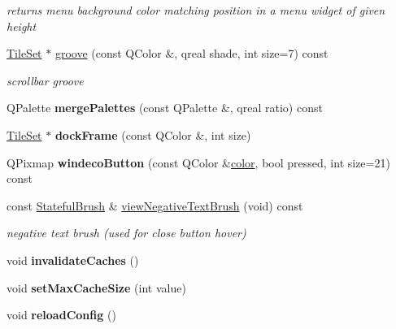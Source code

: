 \begin{Indent}
\begin{DoxyCompactItemize}
\begin{DoxyCompactList}\small\item\em returns menu background color matching position in a menu widget of given height \end{DoxyCompactList}\item 
\mbox{\label{class_style_helper_abae68f2b0645ca73c9b30c8802ee2bd1}} 
\hyperlink{class_tile_set}{Tile\+Set} $\ast$ \hyperlink{class_style_helper_abae68f2b0645ca73c9b30c8802ee2bd1}{groove} (const Q\+Color \&, qreal shade, int size=7) const
\begin{DoxyCompactList}\small\item\em scrollbar groove \end{DoxyCompactList}\item 
\mbox{\label{class_style_helper_ad587578c8c7cf17ac6265a77b0c61fff}} 
Q\+Palette {\bfseries merge\+Palettes} (const Q\+Palette \&, qreal ratio) const
\item 
\mbox{\label{class_style_helper_a8a576dd79d75558ce2d3facfa4fcfc0c}} 
\hyperlink{class_tile_set}{Tile\+Set} $\ast$ {\bfseries dock\+Frame} (const Q\+Color \&, int size)
\item 
\mbox{\label{class_style_helper_a24546af1b3f8c2c08645c237a3403d35}} 
Q\+Pixmap {\bfseries windeco\+Button} (const Q\+Color \&\hyperlink{structcolor}{color}, bool pressed, int size=21) const
\item 
\mbox{\label{class_style_helper_aa2a18fc82550d404341b646444fc520d}} 
const \hyperlink{class_stateful_brush}{Stateful\+Brush} \& \hyperlink{class_style_helper_aa2a18fc82550d404341b646444fc520d}{view\+Negative\+Text\+Brush} (void) const
\begin{DoxyCompactList}\small\item\em negative text brush (used for close button hover) \end{DoxyCompactList}\item 
\mbox{\label{class_style_helper_abe383d0f960ae4e24ef05f075fb3b30f}} 
void {\bfseries invalidate\+Caches} ()
\item 
\mbox{\label{class_style_helper_ab4f4286e15153e0c3e1db4c3f7eec338}} 
void {\bfseries set\+Max\+Cache\+Size} (int value)
\item 
\mbox{\label{class_style_helper_a9f23e7557f9384cd1846f6036a5715ed}} 
void {\bfseries reload\+Config} ()
\end{DoxyCompactItemize}
\end{Indent}
